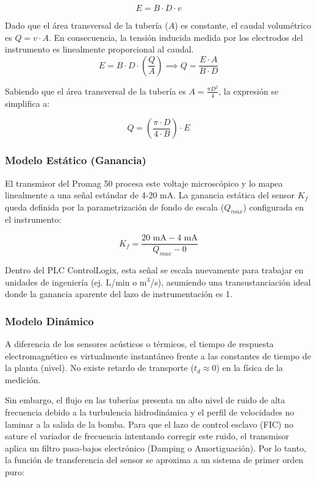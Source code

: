\begin{equation}
  E = B \cdot D \cdot v
  \label{eq:faraday}
\end{equation}

Dado que el área transversal de la tubería ($A$) es constante, el caudal volumétrico es $Q = v \cdot A$. En consecuencia, la tensión inducida medida por los electrodos del instrumento es linealmente proporcional al caudal. 
\begin{equation}
  E = B \cdot D \cdot \left(\frac{Q}{A}\right) \implies Q = \frac{E \cdot A}{B \cdot D}
\end{equation}

Sabiendo que el área transversal de la tubería es $A = \frac{\pi D^2}{4}$, la expresión se simplifica a:

\begin{equation}
  Q = \left( \frac{\pi \cdot D}{4 \cdot B} \right) \cdot E
\end{equation}
\subsubsection{Modelo Estático (Ganancia)}
El transmisor del Promag 50 procesa este voltaje microscópico y lo mapea linealmente a una señal estándar de 4-20 mA. La ganancia estática del sensor $K_f$ queda definida por la parametrización de fondo de escala ($Q_{max}$) configurada en el instrumento:

\begin{equation}
  K_f = \frac{20\text{ mA} - 4\text{ mA}}{Q_{max} - 0}
  \label{eq:ganancia_flujometro}
\end{equation}

Dentro del PLC ControlLogix, esta señal se escala nuevamente para trabajar en unidades de ingeniería (ej. L/min o m$^3$/s), asumiendo una transustanciación ideal donde la ganancia aparente del lazo de instrumentación es 1.

\subsubsection{Modelo Dinámico}
A diferencia de los sensores acústicos o térmicos, el tiempo de respuesta electromagnético es virtualmente instantáneo frente a las constantes de tiempo de la planta (nivel). No existe retardo de transporte ($t_d \approx 0$) en la física de la medición.

Sin embargo, el flujo en las tuberías presenta un alto nivel de ruido de alta frecuencia debido a la turbulencia hidrodinámica y el perfil de velocidades no laminar a la salida de la bomba. Para que el lazo de control esclavo (FIC) no sature el variador de frecuencia intentando corregir este ruido, el transmisor aplica un filtro pasa-bajos electrónico (Damping o Amortiguación). Por lo tanto, la función de transferencia del sensor se aproxima a un sistema de primer orden puro:

